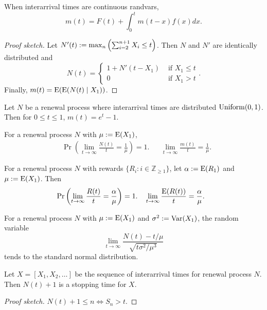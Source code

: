 \documentclass[a4paper, 12pt, fleqn]{article}
\begin{document}
\begin{theorem}
When interarrival times are continuous randvars,
\[ m(t) = F(t) + \int_0^t m(t-x)f(x)dx. \]
\end{theorem}
\begin{proof}[Proof sketch]
Let $N'(t) := \max_n \left( \sum_{i=2}^{n+1} X_i \le t \right)$.
Then $N$ and $N'$ are identically distributed and
\[ N(t) = \begin{cases} 1 + N'(t-X_1) & \textrm{ if } X_1 \le t
\\ 0 & \textrm{ if } X_1 > t \end{cases}. \]
Finally, $m(t) = \operatorname*{E}(\operatorname*{E}(N(t) \mid X_1))$.
\end{proof}

\begin{corollary}
Let $N$ be a renewal process where interarrival times are distributed $\operatorname{Uniform}(0, 1)$.
Then for $0 \le t \le 1$, $m(t) = e^t - 1$.
\end{corollary}

\begin{theorem}
For a renewal process $N$ with $\mu := \operatorname*{E}(X_1)$,
\begin{align*}
& \Pr\left(\lim_{t \to \infty} \frac{N(t)}{t} = \frac{1}{\mu}\right) = 1.
&& \lim_{t \to \infty} \frac{m(t)}{t} = \frac{1}{\mu}.
\end{align*}
\end{theorem}

\begin{theorem}
For a renewal process $N$ with rewards $\{R_i: i \in \mathbb{Z}_{\ge 1}\}$,
let $\alpha := \operatorname*{E}(R_1)$ and $\mu := \operatorname*{E}(X_1)$. Then
\begin{align*}
& \Pr\left(\lim_{t \to \infty} \frac{R(t)}{t} = \frac{\alpha}{\mu}\right) = 1.
&& \lim_{t \to \infty} \frac{\operatorname*{E}(R(t))}{t} = \frac{\alpha}{\mu}.
\end{align*}
\end{theorem}

\begin{theorem}
For a renewal process $N$ with $\mu := \operatorname*{E}(X_1)$ and $\sigma^2 := \operatorname*{Var}(X_1)$,
the random variable
\[ \lim_{t \to \infty} \frac{N(t) - t/\mu}{\sqrt{t\sigma^2/\mu^3}} \]
tends to the standard normal distribution.
\end{theorem}

\begin{lemma}
Let $X = [X_1, X_2, \ldots]$ be the sequence of interarrival times for renewal process $N$.
Then $N(t)+1$ is a stopping time for $X$.
\end{lemma}
\begin{proof}[Proof sketch]
$N(t)+1 \le n \iff S_n > t$.
\end{proof}
\end{document}
